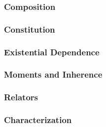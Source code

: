 \documentclass{article}
\newcommand{\BeginMereology}{837}
\newcommand{\EndMereology}{888}
\newcommand{\BeginComposition}{886}
\newcommand{\EndComposition}{914}
\newcommand{\BeginConstitution}{916}
\newcommand{\EndConstitution}{959}
\newcommand{\BeginExistentialDependence}{961}
\newcommand{\EndExistentialDependence}{983}
\newcommand{\BeginMomentsAndInherence}{985}
\newcommand{\EndMomentsAndInherence}{1055}
\newcommand{\BeginRelators}{1057}
\newcommand{\EndRelators}{1137}
\newcommand{\BeginCharacterization}{1139}
\newcommand{\EndCharacterization}{1156}
\begin{document}


\subsubsection{Composition}



\subsubsection{Constitution}



\subsubsection{Existential Dependence}



\subsubsection{Moments and Inherence}



\subsubsection{Relators}



\subsubsection{Characterization}


\end{document}
